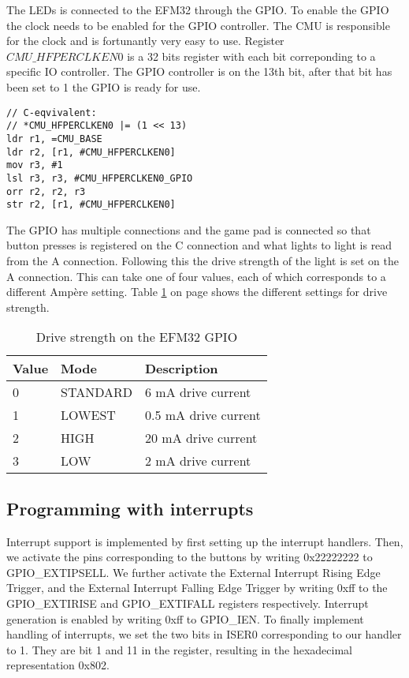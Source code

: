The LEDs is connected to the EFM32 through the GPIO. To enable the GPIO the clock needs to be enabled for the GPIO controller. The CMU is responsible for the clock and is fortunantly very easy to use. Register $CMU\_HFPERCLKEN0$ is a 32 bits register with each bit correponding to a specific IO controller. The GPIO controller is on the 13th bit, after that bit has been set to 1 the GPIO is ready for use.

\begin{lstlisting}
// C-eqvivalent:
// *CMU_HFPERCLKEN0 |= (1 << 13)
ldr r1, =CMU_BASE
ldr r2, [r1, #CMU_HFPERCLKEN0]
mov r3, #1
lsl r3, r3, #CMU_HFPERCLKEN0_GPIO
orr r2, r2, r3
str r2, [r1, #CMU_HFPERCLKEN0]
\end{lstlisting}

The GPIO has multiple connections and the game pad is connected so that button presses is registered on the C connection and what lights to light is read from the A connection. Following this the drive strength of the light is set on the A connection. This can take one of four values, each of which corresponds to a different Ampère setting. Table \ref{tab:drive_strength} on page \pageref{tab:drive_strength} shows the different settings for drive strength.

\begin{table}
    \begin{center}
    \begin{tabular}{| l | l | l |}
        \hline
        Value   & Mode      & Description \\
        \hline
        0       & STANDARD  & 6 mA drive current \\
        \hline
        1       & LOWEST    & 0.5 mA drive current \\
        \hline
        2       & HIGH      & 20 mA drive current \\
        \hline
        3       & LOW       & 2 mA drive current \\
        \hline
    \end{tabular}
    \caption{Drive strength on the EFM32 GPIO}
    \label{tab:drive_strength}
    \end{center}
\end{table}

\subsection{Programming with interrupts}
\label{subsec:dev_pros_interrupts}

Interrupt support is implemented by first setting up the interrupt handlers.
Then, we activate the pins corresponding to the buttons by writing 0x22222222 to GPIO\_EXTIPSELL.
We further activate the External Interrupt Rising Edge Trigger, and the External Interrupt Falling Edge Trigger by writing 0xff to the GPIO\_EXTIRISE and GPIO\_EXTIFALL registers respectively.
Interrupt generation is enabled by writing 0xff to GPIO\_IEN.
To finally implement handling of interrupts, we set the two bits in ISER0 corresponding to our handler to 1. They are bit 1 and 11 in the register, resulting in the hexadecimal representation 0x802.

